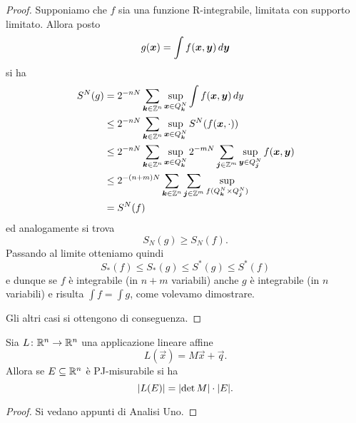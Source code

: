 \begin{proof}
Supponiamo che $f$ sia una funzione R-integrabile, 
limitata con supporto limitato.
Allora posto 
\[
    g(\vec x) = \int f(\vec x, \vec y)\, d\vec y\\
\]
si ha
\begin{align*}
    S^N(g)
    &= 2^{-nN} \sum_{\vec k\in \ZZ^n} 
        \sup_{\vec x\in Q^N_{\vec k}}
            \int f(\vec x,\vec y)\, dy\\
    &\le 2^{-nN} \sum_{\vec k\in \ZZ^n} 
        \sup_{\vec x\in Q^N_{\vec k}}
                S^N(f(\vec x,\cdot))\\
    &\le 2^{-nN} \sum_{\vec k\in \ZZ^n} 
        \sup_{\vec x\in Q^N_{\vec k}}
            2^{-mN} \sum_{\vec j \in \ZZ^m} 
                \sup_{\vec y \in Q^N_{\vec j}} 
                    f(\vec x, \vec y) \\
    &\le 2^{-(n+m)N} \sum_{\vec k\in \ZZ^n} 
        \sum_{\vec j \in \ZZ^m} 
            \sup_{f(Q^N_{\vec k}\times Q^N_{\vec j})}\\
    &= S^N(f)
\end{align*}
ed analogamente si trova
\[
    S_N(g) \ge S_N(f).
\]
Passando al limite otteniamo quindi 
\[
   S_*(f) \le S_*(g) \le S^*(g) \le S^*(f)
\]
e dunque se $f$ è integrabile (in $n+m$ variabili) anche $g$ è integrabile
(in $n$ variabili) 
e risulta $\int f = \int g$, come volevamo dimostrare.

Gli altri casi si ottengono di conseguenza.
\end{proof}

\begin{theorem}
  \label{th:geometria_determinante}
Sia $L\colon \RR^n\to \RR^n$ una applicazione lineare affine
\[
  L(\vec x) = M\vec x + \vec q.
\]
Allora se $E\subset \RR^n$ è PJ-misurabile si ha 
\[
  \abs{L(E)} = \abs{\det M} \cdot \abs{E}.
\]
\end{theorem}
\begin{proof}
Si vedano appunti di Analisi Uno.
\end{proof}

